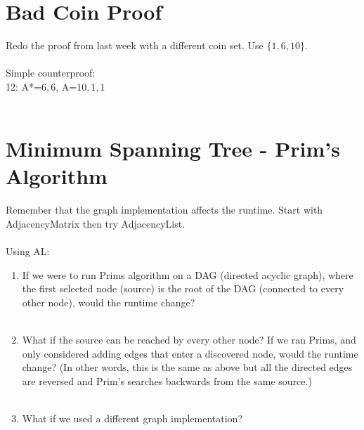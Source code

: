 \documentclass[]{article}
\begin{document}
\section{Bad Coin Proof}
Redo the proof from last week with a different coin set. Use $\{ 1, 6, 10 \}$. \\ \\
Simple counterproof:\\12: A*=$6 , 6$, A=$10, 1, 1$ \\ \\



\section{Minimum Spanning Tree - Prim's Algorithm}
Remember that the graph implementation affects the runtime. Start with AdjacencyMatrix then try AdjacencyList. 
\\ \\

Using AL: 
\begin{enumerate}
	\item If we were to run Prims algorithm on a DAG (directed acyclic graph), where the first selected node (source) is the root of the DAG (connected to every other node), would the runtime change? \\ \\
	\item What if the source can be reached by every other node? If we ran Prims, and only considered adding edges that enter a discovered node, would the runtime change? (In other words, this is the same as above but all the directed edges are reversed and Prim's searches backwards from the same source.) \\ \\ %
	\item What if we used a different graph implementation? \\ \\
\end{enumerate}
\end{document}
